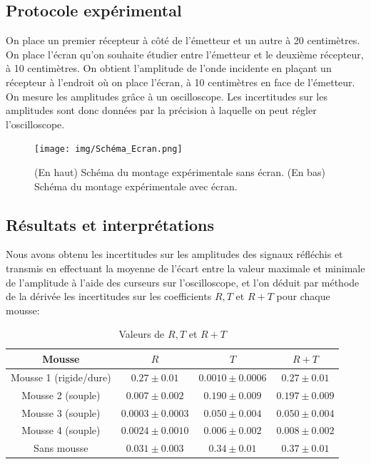 \documentclass[12pt]{article}
\begin{document}
\subsection{Protocole expérimental}
On place un premier récepteur à côté de l'émetteur et un autre à 20 centimètres. On place l'écran qu'on souhaite étudier entre l'émetteur et le deuxième récepteur, à 10 centimètres. On obtient l'amplitude de l'onde incidente en plaçant un récepteur à l'endroit où on place l'écran, à 10 centimètres en face de l'émetteur. On mesure les amplitudes grâce à un oscilloscope. Les incertitudes sur les amplitudes sont donc données par la précision à laquelle on peut régler l'oscilloscope. 

\begin{figure}[h!]
	\begin{center}
		\texttt{[image: img/Schéma\_Ecran.png]}
		\label{Schéma Ecran}
		\caption{(En haut) Schéma du montage expérimentale sans écran. (En bas) Schéma du montage expérimentale avec écran.}
	\end{center}
\end{figure} 

\break
\subsection{Résultats et interprétations}
Nous avons obtenu les incertitudes sur les amplitudes des signaux réfléchis et transmis en effectuant la moyenne de l'écart entre la valeur maximale et minimale de l'amplitude à l'aide
des curseurs sur l'oscilloscope, et l'on déduit par méthode de la dérivée les incertitudes sur les coefficients $R, T$ et $R + T$ pour chaque mousse:
\begin{table}[h!]
	\centering
	\begin{tabular}{||c c c c||} 
		\hline
		Mousse & $R$ & $T$ & $R+T$ \\
		\hline\hline
		\footnotesize
		Mousse 1 (rigide/dure) & $0.27 \pm 0.01$ & $0.0010 \pm 0.0006$ & $0.27 \pm 0.01$ \\ 
		Mousse 2 (souple) & $0.007 \pm 0.002$ & $ 0.190 \pm 0.009$ & $0.197 \pm 0.009$ \\ 
		Mousse 3 (souple) & $0.0003 \pm 0.0003$ & $0.050 \pm 0.004$ & $0.050 \pm 0.004$ \\ 
		Mousse 4 (souple) & $0.0024 \pm 0.0010$ & $0.006 \pm 0.002$ & $0.008 \pm 0.002$ \\ 
		Sans mousse & $0.031 \pm 0.003$ & $0.34 \pm 0.01$ & $0.37 \pm 0.01$ \\ 
		\hline
	\end{tabular}
	\caption{Valeurs de $R, T$ et $R + T$}
	\label{table:1}
\end{table}
\end{document}
